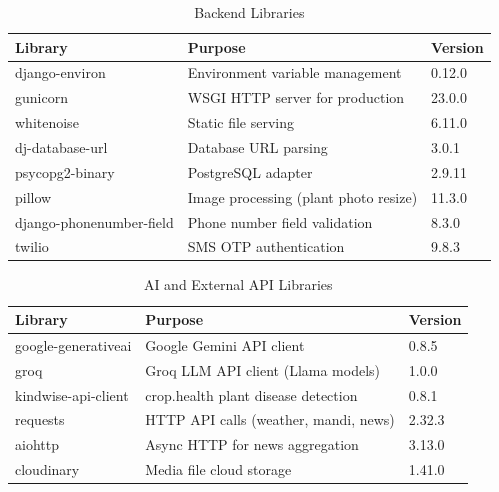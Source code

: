 \documentclass[12pt,a4paper]{article}
\begin{document}
\begin{table}[h]
\caption{Backend Libraries}
\centering
\begin{tabular}{|l|p{5.5cm}|l|}
\hline
\textbf{Library} & \textbf{Purpose} & \textbf{Version} \\ \hline
django-environ & Environment variable management & 0.12.0 \\ \hline
gunicorn & WSGI HTTP server for production & 23.0.0 \\ \hline
whitenoise & Static file serving & 6.11.0 \\ \hline
dj-database-url & Database URL parsing & 3.0.1 \\ \hline
psycopg2-binary & PostgreSQL adapter & 2.9.11 \\ \hline
pillow & Image processing (plant photo resize) & 11.3.0 \\ \hline
django-phonenumber-field & Phone number field validation & 8.3.0 \\ \hline
twilio & SMS OTP authentication & 9.8.3 \\ \hline
\end{tabular}
\end{table}

\begin{table}[h]
\caption{AI and External API Libraries}
\centering
\begin{tabular}{|l|p{5.5cm}|l|}
\hline
\textbf{Library} & \textbf{Purpose} & \textbf{Version} \\ \hline
google-generativeai & Google Gemini API client & 0.8.5 \\ \hline
groq & Groq LLM API client (Llama models) & 1.0.0 \\ \hline
kindwise-api-client & crop.health plant disease detection & 0.8.1 \\ \hline
requests & HTTP API calls (weather, mandi, news) & 2.32.3 \\ \hline
aiohttp & Async HTTP for news aggregation & 3.13.0 \\ \hline
cloudinary & Media file cloud storage & 1.41.0 \\ \hline
\end{tabular}
\end{table}
\end{document}
